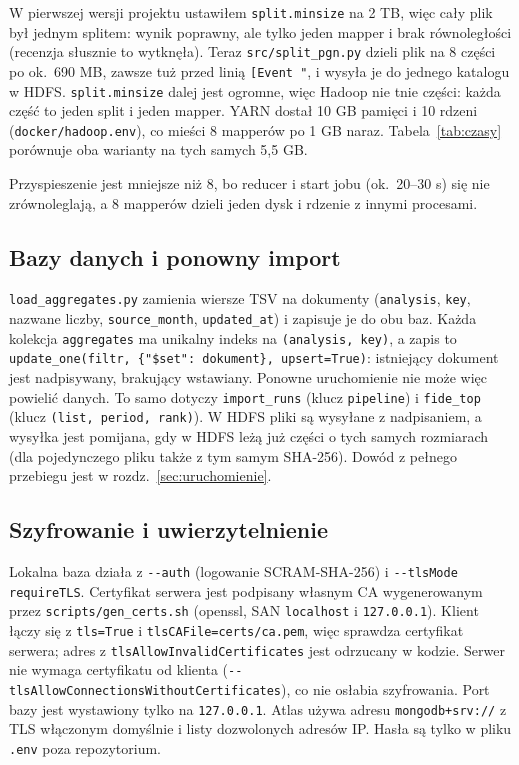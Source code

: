 \documentclass[11pt,a4paper]{article}
\newcommand{\kod}[1]{\texttt{#1}}
\begin{document}
W pierwszej wersji projektu ustawiłem \kod{split.minsize} na 2 TB, więc cały plik był jednym splitem: wynik poprawny, ale tylko jeden mapper i brak równoległości (recenzja słusznie to wytknęła). Teraz \kod{src/split\_pgn.py} dzieli plik na 8 części po ok.\ 690 MB, zawsze tuż przed linią \kod{[Event "}, i wysyła je do jednego katalogu w HDFS. \kod{split.minsize} dalej jest ogromne, więc Hadoop nie tnie części: każda część to jeden split i jeden mapper. YARN dostał 10 GB pamięci i 10 rdzeni (\kod{docker/hadoop.env}), co mieści 8 mapperów po 1 GB naraz. Tabela~\ref{tab:czasy} porównuje oba warianty na tych samych 5,5 GB.

\begin{table}[H]
\centering
\caption{Czas jobów na pełnych danych (5,5 GB) z pliku \kod{czasy.tsv} zapisywanego przez \kod{run\_jobs.sh}. Jeden komputer, w tle działały inne programy (m.in.\ trening sieci na GPU), więc czasy są orientacyjne.}\label{tab:czasy}
\tabCzasy
\end{table}

Przyspieszenie jest mniejsze niż 8, bo reducer i start jobu (ok.\ 20--30 s) się nie zrównoleglają, a 8 mapperów dzieli jeden dysk i rdzenie z innymi procesami.

\subsection{Bazy danych i ponowny import}
\kod{load\_aggregates.py} zamienia wiersze TSV na dokumenty (\kod{analysis}, \kod{key}, nazwane liczby, \kod{source\_month}, \kod{updated\_at}) i zapisuje je do obu baz. Każda kolekcja \kod{aggregates} ma unikalny indeks na \kod{(analysis, key)}, a zapis to \kod{update\_one(filtr, \{"\$set": dokument\}, upsert=True)}: istniejący dokument jest nadpisywany, brakujący wstawiany. Ponowne uruchomienie nie może więc powielić danych. To samo dotyczy \kod{import\_runs} (klucz \kod{pipeline}) i \kod{fide\_top} (klucz \kod{(list, period, rank)}). W HDFS pliki są wysyłane z nadpisaniem, a wysyłka jest pomijana, gdy w HDFS leżą już części o tych samych rozmiarach (dla pojedynczego pliku także z tym samym SHA-256). Dowód z pełnego przebiegu jest w rozdz.~\ref{sec:uruchomienie}.

\subsection{Szyfrowanie i uwierzytelnienie}
Lokalna baza działa z \kod{-{}-auth} (logowanie SCRAM-SHA-256) i \kod{-{}-tlsMode requireTLS}. Certyfikat serwera jest podpisany własnym CA wygenerowanym przez \kod{scripts/gen\_certs.sh} (openssl, SAN \kod{localhost} i \kod{127.0.0.1}). Klient łączy się z \kod{tls=True} i \kod{tlsCAFile=certs/ca.pem}, więc sprawdza certyfikat serwera; adres z \kod{tlsAllowInvalidCertificates} jest odrzucany w kodzie. Serwer nie wymaga certyfikatu od klienta (\kod{-{}-tlsAllowConnectionsWithoutCertificates}), co nie osłabia szyfrowania. Port bazy jest wystawiony tylko na \kod{127.0.0.1}. Atlas używa adresu \kod{mongodb+srv://} z TLS włączonym domyślnie i listy dozwolonych adresów IP. Hasła są tylko w pliku \kod{.env} poza repozytorium.
\end{document}
